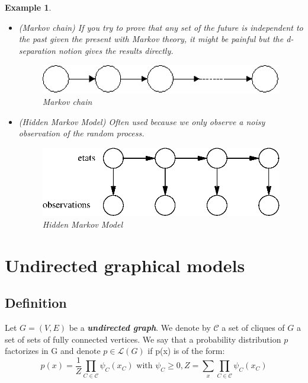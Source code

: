\documentclass[12pt]{report}
\newtheorem{example}{Example}[section]
\begin{document}
\begin{example}
\begin{itemize}
\item (Markov chain) If you try to prove that any set of the future is independent to the past given the present with Markov theory, it might be painful but the d-separation notion gives the results directly.
\begin{figure}[h!]
\centering
	\includegraphics[scale=1]{markov.eps}
\caption{Markov chain}
\end{figure}

\item (Hidden Markov Model) Often used because we only observe a noisy observation of the random process.
\begin{figure}[h!]
\begin{center}
\includegraphics[scale=1]{hmm.eps}
\end{center}
\caption{Hidden Markov Model}
\end{figure}
\end{itemize}
\end{example}












\section{Undirected graphical models}

\subsection{Definition}

\begin{definition}
Let $G = (V, E)$ be a \emph{\textbf{undirected graph}}. We denote by $\mathcal{C}$ a set of cliques of $G$ \ie a set of sets of fully connected vertices. We say that a probability distribution $p$ factorizes in G and denote $p \in \mathcal{L}(G)$ if p(x) is of the form:
\begin{equation*}
p(x) = \frac{1}{Z} \prod_{C \in \mathcal{C}} \psi_C(x_C) \text{ with } \psi_C \geq 0, Z = \sum_{x}\prod_{C \in \mathcal{C}} \psi_C(x_C)
\end{equation*}
\end{definition}
\end{document}
